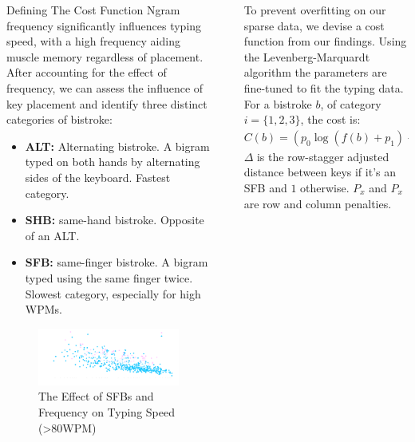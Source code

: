 \documentclass[final,20pt]{beamer}
\newlength{\sepwidth}
\newlength{\colwidth}
\newcommand{\separatorcolumn}{\begin{column}{\sepwidth}\end{column}}
\begin{document}
\begin{frame}[t]
\begin{columns}[t]
\begin{column}{\colwidth}
  \begin{block}{Defining The Cost Function}
         Ngram frequency significantly influences typing speed, with a high frequency aiding muscle memory regardless of placement. After accounting for the effect of frequency, we can assess the influence of key placement and identify three distinct categories of bistroke:

    \begin{itemize}
      \item \textbf{ALT:} Alternating bistroke. A bigram typed on both hands by alternating sides of the keyboard. Fastest category.
      \item \textbf{SHB:} same-hand bistroke. Opposite of an ALT.
      \item \textbf{SFB:} same-finger bistroke. A bigram typed using the same finger twice. Slowest category, especially for high WPMs.
    \end{itemize}

    \begin{figure}[h]
        \centering
        \includegraphics[width=\textwidth]{logos/plot.pdf}
        \caption{The Effect of SFBs and Frequency on Typing Speed (>80WPM)}
        \label{fig:sfbspeed}
    \end{figure}

  \end{block}
\end{column}

\separatorcolumn

\begin{column}{\colwidth}
    To prevent overfitting on our sparse data, we devise a cost function from our findings. Using the Levenberg-Marquardt algorithm the parameters are fine-tuned to fit the typing data. For a bistroke $b$, of category $i = \{1,2,3\}$, the cost is: \justifying
    \begin{equation*}
        C(b)  = \left(p_0 \log (f(b) + p_1) + p_2\right) 
        \times
        \left(1 + P_x(b) P_y(b) +  P^{(i)}_x(b)  P^{(i)}_y(b) \Delta \right)  
    \end{equation*}
    $\Delta$ is the row-stagger adjusted distance between keys if it's an SFB and $1$ otherwise. $P_x$ and $P_x$ are row and column penalties. \justifying
  

\end{column}
\end{columns}
\end{frame}
\end{document}
